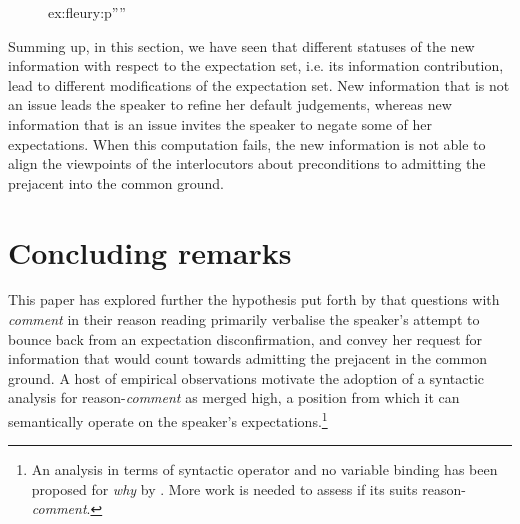 \documentclass[output=paper,colorlinks,citecolor=brown,
]{langscibook}
\begin{document}
\begin{figure}
\caption{ex:fleury:p''''}
\label{fig:fleury:pContingentAcceptp3}
\end{figure}

Summing up, in this section,
we have seen that different statuses of the new information with respect to  the expectation set, i.e. its information contribution, lead to different modifications of the expectation set. New information that is not an issue leads the speaker to refine her default judgements, whereas new information that is an issue invites the speaker to negate some of her expectations. When this computation fails, the new information is not able to align the viewpoints of the interlocutors about preconditions to admitting the prejacent into the common ground.



\section{Concluding remarks}
\label{sec:fleury:conclusion}

This paper has explored further the hypothesis put forth by  \cite{FleuryTovena18} that
questions  with \textit{comment} in their reason reading 
primarily verbalise the  speaker's attempt to bounce back from an expectation disconfirmation, and convey her request for information that would count towards admitting the prejacent in the common ground. A host of empirical observations  motivate the adoption of a syntactic analysis for reason-\textit{comment} as merged high, a position from which it
can semantically operate on the speaker's expectations.\footnote{An analysis in terms of syntactic operator and no variable binding has been proposed for \textit{why} by \cite{StepanovTsai08}. More work is needed to assess if its suits reason-\textit{comment}.}
\end{document}
